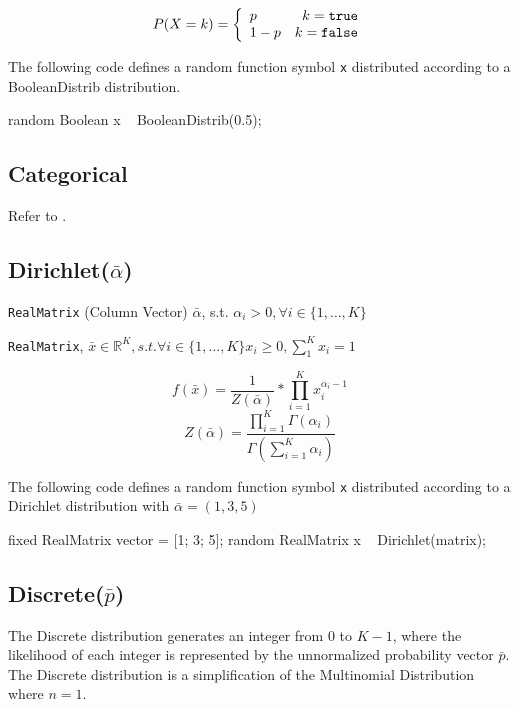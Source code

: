 \[
	P(X = k) = \left\{
	  \begin{array}{lr}
	    p & k = \verb|true| \\
	    1 - p & k = \verb|false|
	  \end{array}
	\right.
\]

The following code defines a random function symbol \verb|x| distributed according to a BooleanDistrib distribution.
\begin{blogcode}
random Boolean x ~ BooleanDistrib(0.5);
\end{blogcode}

\subsection{Categorical}
Refer to .

\subsection{Dirichlet($\bar{\alpha}$)}

\begin{itemize*}
\item[] \verb|RealMatrix| (Column Vector) $\bar{\alpha}$, s.t. $\alpha_{i} > 0, \forall i \in \{1, \ldots, K\}$ 
\end{itemize*}

\begin{itemize*}
\item[] \verb|RealMatrix|, $\bar{x} \in \mathbb{R}^{K}, s.t. \forall i \in \{1, \ldots, K\} x_{i} \geq 0, \sum_{1}^{K} x_{i} = 1 $
\end{itemize*}

\[
	f(\bar{x}) = \frac{1}{Z(\bar{\alpha})} * \prod_{i=1}^{K} x_{i}^{\alpha_{i} - 1}
\]
\[ Z(\bar{\alpha}) = \frac{ \prod_{i=1}^{K} \Gamma(\alpha_{i})   }{ \Gamma(\sum_{i=1}^{K} \alpha_{i} )  } 
\]

The following code defines a random function symbol \verb|x| distributed according to a Dirichlet distribution with $\bar{\alpha} = (1, 3, 5) $
\begin{blogcode}
fixed RealMatrix vector = [1; 3; 5];
random RealMatrix x ~ Dirichlet(matrix);
\end{blogcode}

\subsection{Discrete($\bar{p}$)}
The Discrete distribution generates an integer from $0$ to $K-1$, where the likelihood of each integer is represented by the unnormalized probability vector $\bar{p}$. The Discrete distribution is a simplification of the Multinomial Distribution where $n=1$.

